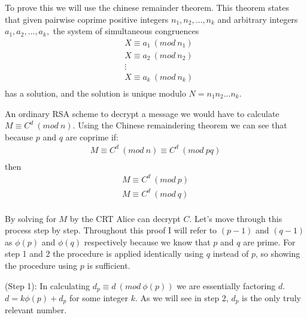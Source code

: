 \documentclass[11pt]{article}
\theoremstyle{definition}
\begin{document}
\begin{enumerate}
To prove this we will use the chinese remainder theorem. This theorem states that given pairwise coprime positive integers $n_1, n_2, …, n_k$ and arbitrary integers $a_1, a_2, …, a_k,$ the system of simultaneous congruences
\begin{align*}
&X \equiv a_1\ (mod\ n_1) \\
&X \equiv a_2\ (mod\ n_2) \\
&\vdots \\
&X \equiv a_k\ (mod\ n_k) \\
\end{align*}
has a solution, and the solution is unique modulo $N = n_1n_2...n_k.$

An ordinary RSA scheme to decrypt a message we would have to calculate $M \equiv C^d\ (mod\ n)$. 
Using the Chinese remaindering theorem we can see that because $p$ and $q$ are coprime if:
\begin{align*}
M \equiv C^d\ (mod\ n) \equiv C^d\ (mod\ pq)\\
\end{align*} 
then
\begin{align*}
M \equiv C^d\ (mod\ p) \\
M \equiv C^d\ (mod\ q)\\
\end{align*}

By solving for $M$ by the CRT Alice can decrypt $C$. Let’s move through this process step by step. Throughout this proof I will refer to $(p-1)$ and $(q-1)$ as $\phi(p)$ and $\phi(q)$ respectively because we know that $p$ and $q$ are prime. For step 1 and 2 the procedure is applied identically using $q$ instead of $p$, so showing the procedure using $p$ is sufficient.

(Step 1): In calculating $d_p \equiv d\ (mod\ \phi(p))$ we are essentially factoring $d$. $d = k\phi(p) + d_p$ for some integer $k$. As we will see in step 2, $d_p$ is the only truly relevant number. \\


\end{enumerate}
\end{document}
